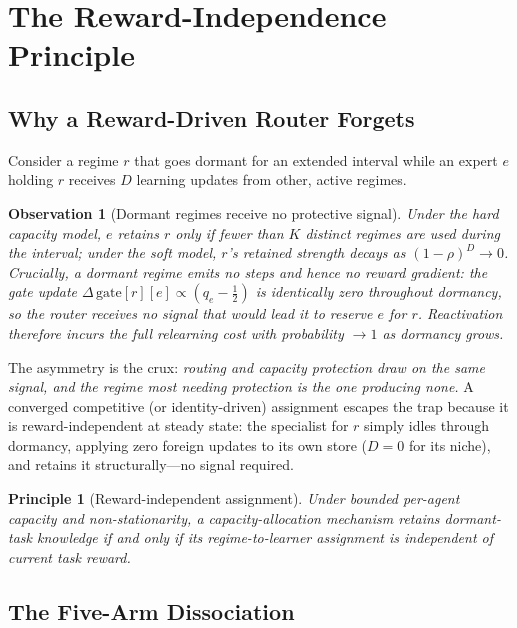 \documentclass[11pt]{article}
\newtheorem{observation}{Observation}
\newtheorem{principle}{Principle}
\begin{document}
\section{The Reward-Independence Principle}
\label{sec:principle}

\subsection{Why a Reward-Driven Router Forgets}

Consider a regime $r$ that goes dormant for an extended interval while an expert
$e$ holding $r$ receives $D$ learning updates from other, active regimes.

\begin{observation}[Dormant regimes receive no protective signal]
Under the hard capacity model, $e$ retains $r$ only if fewer than $K$ distinct
regimes are used during the interval; under the soft model, $r$'s retained
strength decays as $(1-\rho)^D \to 0$. Crucially, a dormant regime emits no
steps and hence no reward gradient: the gate update
$\Delta\,\mathrm{gate}[r][e] \propto (q_e - \tfrac12)$ is identically zero
throughout dormancy, so the router receives no signal that would lead it to
reserve $e$ for $r$. Reactivation therefore incurs the full relearning cost with
probability $\to 1$ as dormancy grows.
\end{observation}

The asymmetry is the crux: \emph{routing and capacity protection draw on the
same signal, and the regime most needing protection is the one producing none.}
A converged competitive (or identity-driven) assignment escapes the trap because
it is reward-independent at steady state: the specialist for $r$ simply idles
through dormancy, applying zero foreign updates to its own store ($D = 0$ for
its niche), and retains it structurally---no signal required.

\begin{principle}[Reward-independent assignment]
\label{prin:ria}
Under bounded per-agent capacity and non-stationarity, a capacity-allocation
mechanism retains dormant-task knowledge if and only if its regime-to-learner
assignment is independent of current task reward.
\end{principle}

\subsection{The Five-Arm Dissociation}
\end{document}
